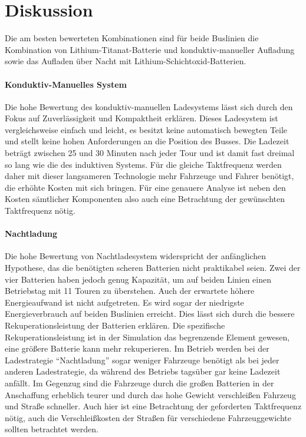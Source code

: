 \section{Diskussion} 
Die am besten bewerteten Kombinationen sind für beide Buslinien die Kombination von Lithium-Titanat-Batterie und konduktiv-manueller Aufladung sowie das Aufladen über Nacht mit Lithium-Schichtoxid-Batterien.

\paragraph{Konduktiv-Manuelles System} Die hohe Bewertung des konduktiv-manuellen Ladesystems lässt sich durch den Fokus auf Zuverlässigkeit und Kompaktheit erklären. Dieses Ladesystem ist vergleichsweise einfach und leicht, es besitzt keine automatisch bewegten Teile und stellt keine hohen Anforderungen an die Position des Busses. Die Ladezeit beträgt zwischen 25 und 30 Minuten nach jeder Tour und ist damit fast dreimal so lang wie die des induktiven Systems. Für die gleiche Taktfrequenz werden daher mit dieser langsameren Technologie mehr Fahrzeuge und Fahrer benötigt, die erhöhte Kosten mit sich bringen. Für eine genauere Analyse ist neben den Kosten sämtlicher Komponenten also auch eine Betrachtung der gewünschten Taktfrequenz nötig.

\paragraph{Nachtladung} Die hohe Bewertung von Nachtladesystem widerspricht der anfänglichen Hypothese, das die benötigten scheren Batterien nicht praktikabel seien. Zwei der vier Batterien haben jedoch genug Kapazität, um auf beiden Linien einen Betriebstag mit 11 Touren zu überstehen. Auch der erwartete höhere Energieaufwand ist nicht aufgetreten. Es wird sogar der niedrigste Energieverbrauch auf beiden Buslinien erreicht. Dies lässt sich durch die bessere Rekuperationsleistung der Batterien erklären. Die spezifische Rekuperationsleistung ist in der Simulation das begrenzende Element gewesen, eine größere Batterie kann mehr rekuperieren. Im Betrieb werden bei der Ladestrategie "`Nachtladung"' sogar weniger Fahrzeuge benötigt als bei jeder anderen Ladestrategie, da während des Betriebs tagsüber gar keine Ladezeit anfällt. Im Gegenzug sind die Fahrzeuge durch die großen Batterien in der Anschaffung erheblich teurer und durch das hohe Gewicht verschleißen Fahrzeug und Straße schneller. Auch hier ist eine Betrachtung der geforderten Taktfrequenz nötig, auch die Verschleißkosten der Straßen für verschiedene Fahrzeuggewichte sollten betrachtet werden.


